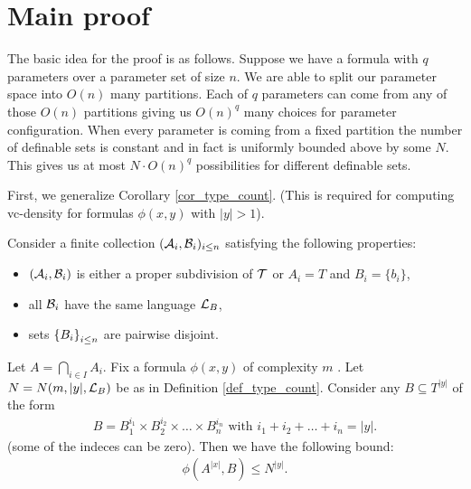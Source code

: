 \section{Main proof}

The basic idea for the proof is as follows.
Suppose we have a formula with $q$ parameters over a parameter set of size $n$.
We are able to split our parameter space into $O(n)$ many partitions. Each of $q$ parameters can come from any of those $O(n)$ partitions giving us $O(n)^q$ many choices for parameter configuration. When every parameter is coming from a fixed partition the number of definable sets is constant and in fact is uniformly bounded above by some $N$. This gives us at most $N \cdot O(n)^q$ possibilities for different definable sets.

First, we generalize Corollary \ref{cor_type_count}. (This is required for computing vc-density for formulas $\phi(x, y)$ with $|y| > 1$).

\begin{Lemma} \label{lm_partition_bound}
  Consider a finite collection $(\mathcal A_i, \mathcal B_i)_{i \leq n}$ satisfying the following properties:
  \begin{itemize}
  \item $(\mathcal A_i, \mathcal B_i)$ is either a proper subdivision of $\operatorname{\mathcal T}$ or $A_i = T$ and $B_i = \{b_i\}$,
  \item all $\mathcal B_i$ have the same language $\mathcal L_B$,
  \item sets $\left\{B_i\right\}_{i \leq n}$ are pairwise disjoint.
  \end{itemize}
  Let $A = \bigcap_{i \in I} A_i$.
  Fix a formula $\phi(x, y)$ of complexity $m$ . Let $N = N(m, |y|, \mathcal L_B)$ be as in Definition \ref{def_type_count}. Consider any $B \subseteq T^{|y|}$ of the form
  \begin{align*}
    B = B_1^{i_1} \times B_2^{i_2} \times \ldots \times B_n^{i_n} \text { with } i_1 + i_2 + \ldots + i_n = |y|.
  \end{align*}
  (some of the indeces can be zero). Then we have the following bound:
  \begin{align*}
    \phi(A^{|x|}, B) \leq N^{|y|}.
  \end{align*}
\end{Lemma}

